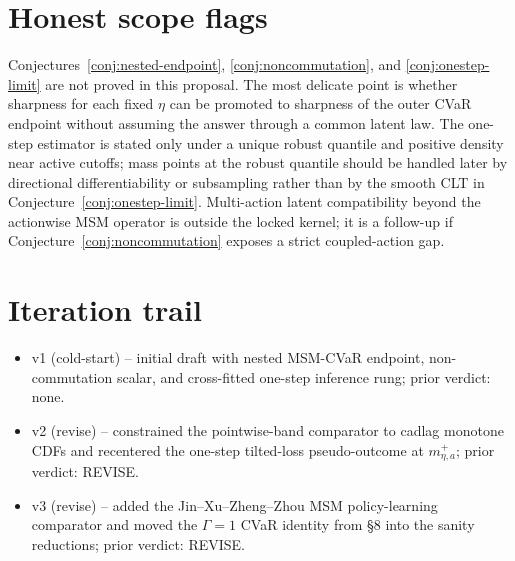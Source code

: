\documentclass[11pt]{article}
\theoremstyle{definition}
\theoremstyle{plain}
\theoremstyle{remark}
\begin{document}
\section{Honest scope flags}
Conjectures~\ref{conj:nested-endpoint}, \ref{conj:noncommutation}, and \ref{conj:onestep-limit} are not proved in this proposal.  The most delicate point is whether sharpness for each fixed \(\eta\) can be promoted to sharpness of the outer CVaR endpoint without assuming the answer through a common latent law.  The one-step estimator is stated only under a unique robust quantile and positive density near active cutoffs; mass points at the robust quantile should be handled later by directional differentiability or subsampling rather than by the smooth CLT in Conjecture~\ref{conj:onestep-limit}.  Multi-action latent compatibility beyond the actionwise MSM operator is outside the locked kernel; it is a follow-up if Conjecture~\ref{conj:noncommutation} exposes a strict coupled-action gap.

\section{Iteration trail}
\begin{itemize}[leftmargin=2em]
\item v1 (cold-start) -- initial draft with nested MSM-CVaR endpoint, non-commutation scalar, and cross-fitted one-step inference rung; prior verdict: none.
\item v2 (revise) -- constrained the pointwise-band comparator to cadlag monotone CDFs and recentered the one-step tilted-loss pseudo-outcome at \(m_{\eta,a}^+\); prior verdict: REVISE.
\item v3 (revise) -- added the Jin--Xu--Zheng--Zhou MSM policy-learning comparator and moved the \(\Gamma=1\) CVaR identity from §8 into the sanity reductions; prior verdict: REVISE.
\end{itemize}
\end{document}
